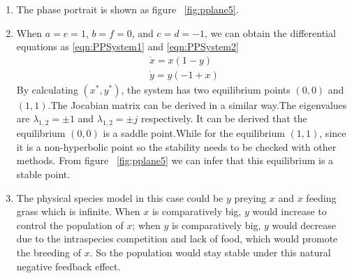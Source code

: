 \begin{enumerate}

\item The phase portrait is shown as figure ~\ref{fig:pplane5}.
\item When 
$a=e=1$, $b=f=0$, and $c=d=-1$,
  we can obtain the differential equations as \eqref{eqn:PPSystem1} and \eqref{eqn:PPSystem2} 
\begin{subequations}\label{eqn:PPSystem}
\begin{align}
    \dot{x} = x(1-y) \label{eqn:PPSystem1} \\
    \dot{y} = y(-1+x) \label{eqn:PPSystem2}
\end{align}
\end{subequations}
By calculating $(x^*,y^*)$, the system has two equilibrium points $(0,0)$ and $(1,1)$.The Jocabian matrix can be derived in a similar way.The eigenvalues are $\lambda_{1,2} = \pm 1$ and $\lambda_{1,2} = \pm j$ respectively. It can be derived that the equilibrium $(0,0)$ is a saddle point.While for the equilibrium $(1,1)$, since it is a non-hyperbolic point so the stability needs to be checked with other methods. From figure ~\ref{fig:pplane5} we can infer that this equilibrium is a stable point. 
\item The physical species model in this case could be $y$ preying $x$ and $x$ feeding grass which is infinite. When $x$ is comparatively big, $y$ would increase to control the population of $x$; when $y$ is comparatively big, $y$ would decrease due to the intraspecies competition and lack of food, which would promote the breeding of $x$. So the population would stay stable under this natural negative feedback effect.  
\end{enumerate}